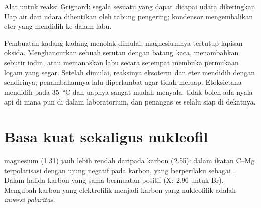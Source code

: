 \begin{omfigure}

{\small Alat untuk reaksi Grignard: segala sesuatu yang dapat dicapai
udara dikeringkan. Uap air dari udara dihentikan oleh tabung pengering;
kondensor mengembalikan eter yang mendidih ke dalam labu.}
\end{omfigure}

\begin{inthelab}
Pembuatan  kadang-kadang menolak dimulai: magnesiumnya
tertutup lapisan oksida. Menghancurkan sebuah serutan dengan batang kaca,
menambahkan sebutir  iodin, atau memanaskan labu secara setempat
membuka permukaan logam yang segar. Setelah dimulai, reaksinya eksoterm
dan eter mendidih dengan sendirinya; penambahannya lalu diperlambat agar
tidak meluap. Etoksietana mendidih pada \qty{35}{\celsius} dan uapnya
sangat mudah menyala: tidak boleh ada nyala api di mana pun di dalam
laboratorium, dan penangas es selalu siap di dekatnya.
\end{inthelab}

\section{Basa kuat sekaligus nukleofil}

\begin{definition}\label{def:b1:organomagnesium:umpolung}
 magnesium (1.31) jauh lebih rendah daripada
 karbon (2.55): dalam  ikatan C--Mg
terpolarisasi dengan ujung negatif pada karbon, yang berperilaku sebagai
. Dalam halida  karbon yang sama bermuatan positif
(X: 2.96 untuk Br). Mengubah karbon yang elektrofilik menjadi karbon yang
nukleofilik adalah \emph{inversi polaritas}.
\end{definition}

